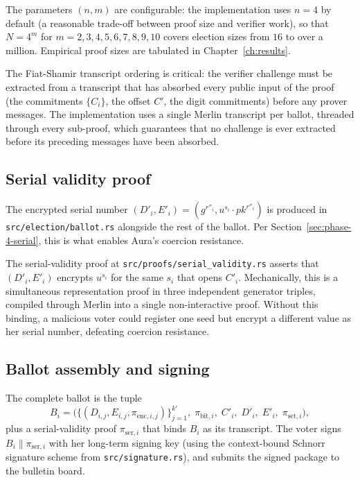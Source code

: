 \documentclass[12pt,a4paper,oneside]{report}
\begin{document}
The parameters $(n, m)$ are configurable: the implementation uses 
$n = 4$ by default (a reasonable trade-off between proof size and 
verifier work), so that $N = 4^m$ for $m = 2, 3, 4, 5, 6, 7, 8, 9, 10$ 
covers election sizes from $16$ to over a million. Empirical proof 
sizes are tabulated in Chapter~\ref{ch:results}.

The Fiat-Shamir transcript ordering is critical: the verifier challenge 
must be extracted from a transcript that has absorbed every public input 
of the proof (the commitments $\{C_i\}$, the offset $C'$, the digit 
commitments) before any prover messages. The implementation uses a 
single Merlin transcript per ballot, threaded through every sub-proof, 
which guarantees that no challenge is ever extracted before its 
preceding messages have been absorbed.

\subsection{Serial validity proof}
\label{sec:impl-serial-validity}

The encrypted serial number $(D'_i, E'_i) = (g^{r''_i}, u^{s_i} \cdot pk^{r''_i})$ 
is produced in \texttt{src/election/ballot.rs} alongside the rest of the 
ballot. Per Section~\ref{sec:phase-4-serial}, this is what enables 
Aura's coercion resistance.

The serial-validity proof at \texttt{src/proofs/serial\_validity.rs} 
asserts that $(D'_i, E'_i)$ encrypts $u^{s_i}$ for the same $s_i$ that 
opens $C'_i$. Mechanically, this is a simultaneous representation 
proof in three independent generator triples, compiled through Merlin 
into a single non-interactive proof. Without this binding, a malicious 
voter could register one seed but encrypt a different value as her 
serial number, defeating coercion resistance.

\subsection{Ballot assembly and signing}
\label{sec:impl-ballot-assembly}

The complete ballot is the tuple
\[
    B_i = \big(\{(D_{i, j}, E_{i, j}, \pi_{\text{enc}, i, j})\}_{j=1}^{k'},\; 
    \pi_{\text{bit}, i},\; C'_i,\; D'_i,\; E'_i,\; \pi_{\text{set}, i}\big),
\]
plus a serial-validity proof $\pi_{\text{ser}, i}$ that binds $B_i$ as 
its transcript. The voter signs $B_i \| \pi_{\text{ser}, i}$ with her 
long-term signing key (using the context-bound Schnorr signature scheme 
from \texttt{src/signature.rs}), and submits the signed package to the 
bulletin board.
\end{document}
